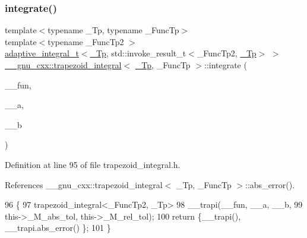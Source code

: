 \subsubsection{\texorpdfstring{integrate()}{integrate()}}
{\footnotesize\ttfamily template$<$typename \+\_\+\+Tp, typename \+\_\+\+Func\+Tp$>$ \\
template$<$typename \+\_\+\+Func\+Tp2 $>$ \\
\hyperlink{struct____gnu__cxx_1_1adaptive__integral__t}{adaptive\+\_\+integral\+\_\+t}$<$\hyperlink{namespace____gnu__cxx_a3b19a9c800ca194374ef9172290f7d79}{\+\_\+\+Tp}, std\+::invoke\+\_\+result\+\_\+t$<$\+\_\+\+Func\+Tp2, \hyperlink{namespace____gnu__cxx_a3b19a9c800ca194374ef9172290f7d79}{\+\_\+\+Tp}$>$ $>$ \hyperlink{class____gnu__cxx_1_1trapezoid__integral}{\+\_\+\+\_\+gnu\+\_\+cxx\+::trapezoid\+\_\+integral}$<$ \hyperlink{namespace____gnu__cxx_a3b19a9c800ca194374ef9172290f7d79}{\+\_\+\+Tp}, \+\_\+\+Func\+Tp $>$\+::integrate (\begin{DoxyParamCaption}\item[{\+\_\+\+Func\+Tp2}]{\+\_\+\+\_\+fun,  }\item[{\hyperlink{namespace____gnu__cxx_a3b19a9c800ca194374ef9172290f7d79}{\+\_\+\+Tp}}]{\+\_\+\+\_\+a,  }\item[{\hyperlink{namespace____gnu__cxx_a3b19a9c800ca194374ef9172290f7d79}{\+\_\+\+Tp}}]{\+\_\+\+\_\+b }\end{DoxyParamCaption})\hspace{0.3cm}{\ttfamily [inline]}}



Definition at line 95 of file trapezoid\+\_\+integral.\+h.



References \+\_\+\+\_\+gnu\+\_\+cxx\+::trapezoid\+\_\+integral$<$ \+\_\+\+Tp, \+\_\+\+Func\+Tp $>$\+::abs\+\_\+error().


\begin{DoxyCode}
96         \{
97           trapezoid\_integral<\_FuncTp2, \_Tp>
98             \_\_trapi(\_\_fun, \_\_a, \_\_b,
99                     this->\_M\_abs\_tol, this->\_M\_rel\_tol);
100           \textcolor{keywordflow}{return} \{\_\_trapi(), \_\_trapi.abs\_error() \};
101         \}
\end{DoxyCode}
\mbox{\label{class____gnu__cxx_1_1trapezoid__integral_a2a2ee81890e75ec627573eb1234079c8}} 
